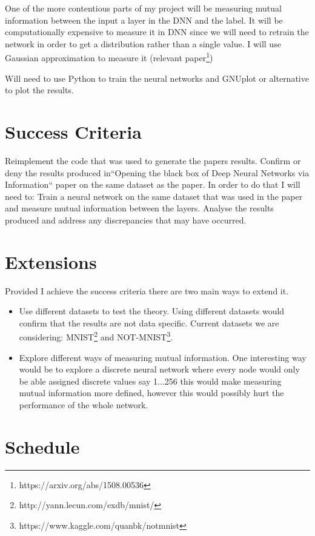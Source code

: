 \documentclass[12pt]{article}
\begin{document}
One of the more contentious parts of my project will be measuring mutual
information between the input a layer in the DNN and the label. It will be
computationally expensive to measure it in DNN since we will need to retrain the
network in order to get a distribution rather than a single value. I will use
Gaussian approximation to measure it (relevant
paper\footnote{https://arxiv.org/abs/1508.00536})

Will need to use Python to train the neural networks and GNUplot or alternative
to plot the results.

\section*{Success Criteria}

Reimplement the code that was used to generate the papers results. Confirm or
deny the results produced in``Opening the black box of Deep Neural Networks via
Information`` paper on the same dataset as the paper. In order to do that I will
need to: Train a neural network on the same dataset that was used in the paper
and measure mutual information between the layers. Analyse the results produced
and address any discrepancies that may have occurred.

\section*{Extensions}

Provided I achieve the success criteria there are two main ways to extend it.

\begin{itemize}
  \item {
      Use different datasets to test the theory. Using different datasets would
      confirm that the results are not data specific. Current datasets we
      are considering: MNIST\footnote{http://yann.lecun.com/exdb/mnist/} and
      NOT-MNIST\footnote{https://www.kaggle.com/quanbk/notmnist}.
  }
  \item {
      Explore different ways of measuring mutual information. One interesting
      way would be to explore a discrete neural network where every node would
      only be able assigned discrete values say {1...256} this would make
      measuring mutual information more defined, however this would possibly
      hurt the performance of the whole network.
  }
\end{itemize}

\section*{Schedule}
\end{document}
